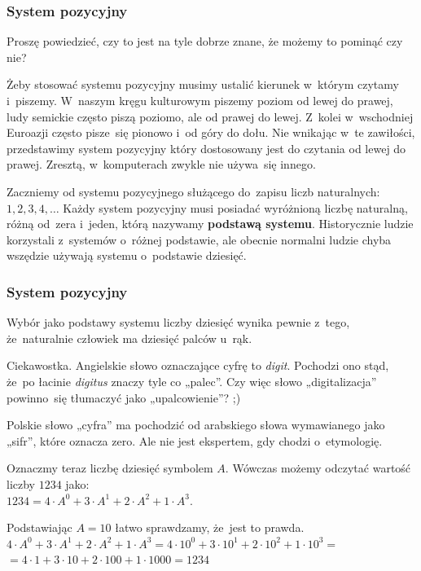 \documentclass[10pt,t]{beamer}
\begin{document}
\begin{frame}
  \frametitle{System pozycyjny}


  Proszę powiedzieć, czy to jest na tyle dobrze znane, że możemy to pominąć
  czy nie?

  Żeby stosować systemu pozycyjny musimy ustalić kierunek w~którym czytamy
  i~piszemy. W~naszym kręgu kulturowym piszemy poziom od lewej do prawej,
  ludy semickie często piszą poziomo, ale od prawej do lewej. Z~kolei
  w~wschodniej Euroazji często pisze~się pionowo i~od góry do dołu.
  Nie wnikając w~te zawiłości, przedstawimy system pozycyjny który
  dostosowany jest do czytania od lewej do prawej. Zresztą, w~komputerach
  zwykle nie używa~się innego.

  Zaczniemy od systemu pozycyjnego służącego do~zapisu liczb
  naturalnych: $1, 2, 3, 4, \ldots$ Każdy system pozycyjny musi posiadać
  wyróżnioną liczbę naturalną, różną od~zera i~jeden, którą nazywamy
  \textbf{podstawą systemu}. Historycznie ludzie korzystali z~systemów
  o~różnej podstawie, ale obecnie normalni ludzie chyba wszędzie używają
  systemu o~podstawie dziesięć.

\end{frame}





\begin{frame}
  \frametitle{System pozycyjny}


  Wybór jako podstawy systemu liczby dziesięć wynika pewnie z~tego,
  że~naturalnie człowiek ma dziesięć palców u~rąk.

  \alert{Ciekawostka.} Angielskie słowo oznaczające cyfrę to \textit{digit}.
  Pochodzi ono stąd, że~po łacinie \textit{digitus} znaczy tyle co „palec”.
  Czy więc słowo „digitalizacja” powinno~się tłumaczyć jako „upalcowienie”?
  ;)

  Polskie słowo „cyfra” ma pochodzić od arabskiego słowa wymawianego jako
  „sifr”, które oznacza zero. Ale nie jest ekspertem, gdy chodzi
  o~etymologię.

  Oznaczmy teraz liczbę dziesięć symbolem $A$. Wówczas możemy odczytać
  wartość liczby $1234$ jako: \\
  $\displaystyle
  1234 = 4 \cdot A^{ 0 } + 3 \cdot A^{ 1 } + 2 \cdot A^{ 2 } + 1 \cdot A^{ 3 }.$

  Podstawiając $A = 10$ łatwo sprawdzamy, że~jest to prawda. \\
  $\displaystyle
  4 \cdot A^{ 0 } + 3 \cdot A^{ 1 } + 2 \cdot A^{ 2 } + 1 \cdot A^{ 3 } =
  4 \cdot 10^{ 0 } + 3 \cdot 10^{ 1 } + 2 \cdot 10^{ 2 } + 1 \cdot 10^{ 3 } =$ \\
  $\displaystyle
  = 4 \cdot 1 + 3 \cdot 10 + 2 \cdot 100 + 1 \cdot 1 000 = 1234$

\end{frame}
\end{document}
